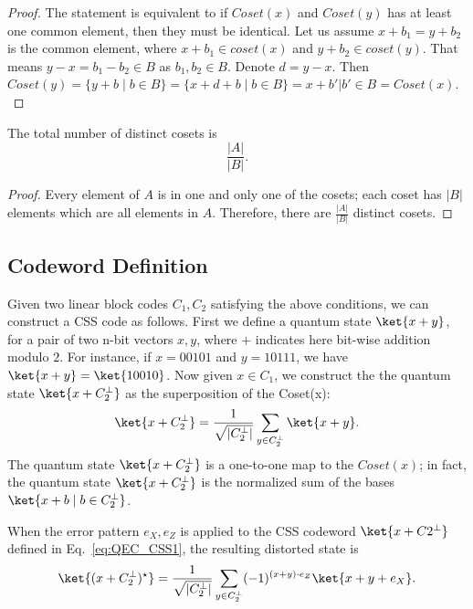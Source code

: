 \begin{proof}
The statement is equivalent  to if \(Coset(x)\) and \(Coset(y)\) has at least one common element, then they must be identical. Let us assume \(x+b_1 = y + b_2\) is the common element, where \(x+b_1\in coset(x)\) and \(y+b_2\in coset(y)\). That means \(y-x = b_1 - b_2 \in B\) as \(b_1, b_2 \in B\). Denote \(d = y-x\). Then \(Coset(y) = \{y + b \;|\; b \in B\} = \{x + d + b \;| \;b \in B\} = {x + b' | b' \in B} = Coset(x).\)
\end{proof}

\begin{corollary}
The total number of distinct cosets is 
\[\frac{|A|}{|B|}.\]
\end{corollary}
\begin{proof}
Every element of \(A\) is in one and only one of the cosets; each coset has \(|B|\) elements which are all elements in \(A\). Therefore, there are \(\frac{|A|}{|B|}\) distinct cosets. 
\end{proof}

\subsection{Codeword Definition}
Given two linear block codes \(C_1, C_2\) satisfying the above conditions, we can construct a CSS code as follows.   First we define a quantum state \(\ket{x + y}\), for a pair of two n-bit vectors \(x, y\), where \(+\) indicates here bit-wise addition modulo \(2\). For instance, if \(x = 00101\) and \(y = 10111\), we have \(\ket{x + y} = \ket{10010}\). Now given \(x \in C_1\), we construct the the quantum state \(\ket{x + C_2^{\perp}}\) as the superposition of the Coset(x): 
\begin{align}
\ket{x + C_2^{\perp}} = \frac{1}{\sqrt{|C_2^{\perp}|}}\sum_{y \in C_2^{\perp}} \ket{x+y}.
\label{eq:QEC_CSS1}
\end{align}
The quantum state \(\ket{x + C_2^{\perp}}\) is a one-to-one map to the \(Coset(x)\); in fact, the quantum state \(\ket{x + C_2^{\perp}}\) is the normalized sum of the bases \(\ket{x+b\;|\; b \in C_2^{\perp}}\).


When the error pattern \(e_X, e_Z\) is applied to the CSS codeword \(\ket{x + C2^{\perp}}\) defined in Eq.~\ref{eq:QEC_CSS1}, the resulting distorted state is
\begin{align}
\ket{(x + C_2^{\perp})^{\star}} = \frac{1}{\sqrt{|C_2^{\perp}|}}\sum_{y \in C_2^{\perp}} (-1)^{(x+y)\cdot e_Z} \ket{x+y + e_X}.
\label{eq:QEC_CodeNoisy}
\end{align}

